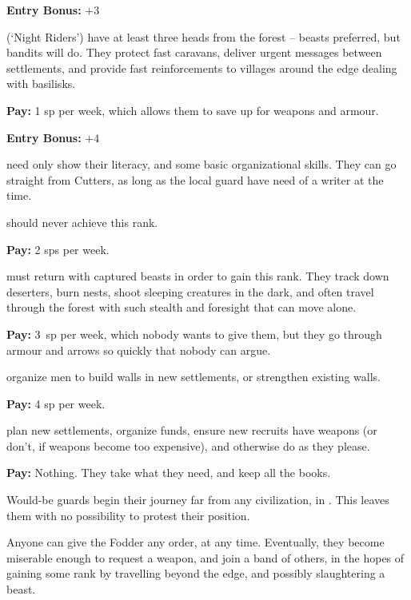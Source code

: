 \begin{multicols}{2}
\begin{description}
  \textbf{Entry Bonus:} $+3$

  (`Night Riders')
  have at least three heads from the forest -- beasts preferred, but bandits will do.
  They protect fast caravans, deliver urgent messages between settlements, and provide fast reinforcements to \glspl{village} around the \gls{edge} dealing with basilisks.

  \textbf{Pay:} 1 \gls{sp} per week, which allows them to save up for weapons and armour.

  \textbf{Entry Bonus:} $+4$

  \item[\Glspl{jotter}]
  \label{jotter}%
  need only show their literacy, and some basic organizational skills.
  They can go straight from Cutters, as long as the local \gls{guard} have need of a writer at the time.

   should never achieve this rank.

  \textbf{Pay:} 2 \glspl{sp} per week.

  \label{ranger}
  must return with captured beasts in order to gain this rank.
  They track down deserters, burn nests, shoot sleeping creatures in the dark, and often travel through the forest with such stealth and foresight that can move alone.
  
  \textbf{Pay:} 3~\gls{sp} per week, which nobody wants to give them, but they go through armour and arrows so quickly that nobody can argue.

  organize men to build walls in new settlements, or strengthen existing walls.

  \textbf{Pay:} 4 \gls{sp} per week.

  plan new settlements, organize funds, ensure new recruits have weapons (or don't, if weapons become too expensive), and otherwise do as they please.

  \textbf{Pay:} Nothing.
  They take what they need, and keep all the books.

\end{description}

\noindent
Would-be \glspl{guard} begin their journey far from any civilization, in .
This leaves them with no possibility to protest their position.

Anyone can give the Fodder any order, at any time.
Eventually, they become miserable enough to request a weapon, and join a band of others, in the hopes of gaining some rank by travelling beyond the \gls{edge}, and possibly slaughtering a beast.


\end{multicols}

